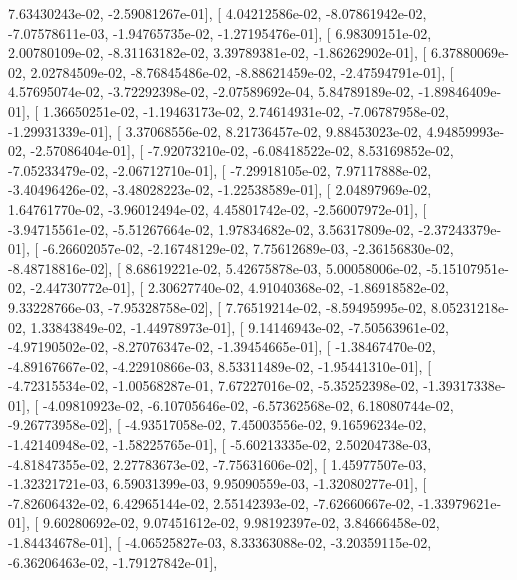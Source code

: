 \documentclass{article}
\begin{document}
          7.63430243e-02,  -2.59081267e-01],
       [  4.04212586e-02,  -8.07861942e-02,  -7.07578611e-03,
         -1.94765735e-02,  -1.27195476e-01],
       [  6.98309151e-02,   2.00780109e-02,  -8.31163182e-02,
          3.39789381e-02,  -1.86262902e-01],
       [  6.37880069e-02,   2.02784509e-02,  -8.76845486e-02,
         -8.88621459e-02,  -2.47594791e-01],
       [  4.57695074e-02,  -3.72292398e-02,  -2.07589692e-04,
          5.84789189e-02,  -1.89846409e-01],
       [  1.36650251e-02,  -1.19463173e-02,   2.74614931e-02,
         -7.06787958e-02,  -1.29931339e-01],
       [  3.37068556e-02,   8.21736457e-02,   9.88453023e-02,
          4.94859993e-02,  -2.57086404e-01],
       [ -7.92073210e-02,  -6.08418522e-02,   8.53169852e-02,
         -7.05233479e-02,  -2.06712710e-01],
       [ -7.29918105e-02,   7.97117888e-02,  -3.40496426e-02,
         -3.48028223e-02,  -1.22538589e-01],
       [  2.04897969e-02,   1.64761770e-02,  -3.96012494e-02,
          4.45801742e-02,  -2.56007972e-01],
       [ -3.94715561e-02,  -5.51267664e-02,   1.97834682e-02,
          3.56317809e-02,  -2.37243379e-01],
       [ -6.26602057e-02,  -2.16748129e-02,   7.75612689e-03,
         -2.36156830e-02,  -8.48718816e-02],
       [  8.68619221e-02,   5.42675878e-03,   5.00058006e-02,
         -5.15107951e-02,  -2.44730772e-01],
       [  2.30627740e-02,   4.91040368e-02,  -1.86918582e-02,
          9.33228766e-03,  -7.95328758e-02],
       [  7.76519214e-02,  -8.59495995e-02,   8.05231218e-02,
          1.33843849e-02,  -1.44978973e-01],
       [  9.14146943e-02,  -7.50563961e-02,  -4.97190502e-02,
         -8.27076347e-02,  -1.39454665e-01],
       [ -1.38467470e-02,  -4.89167667e-02,  -4.22910866e-03,
          8.53311489e-02,  -1.95441310e-01],
       [ -4.72315534e-02,  -1.00568287e-01,   7.67227016e-02,
         -5.35252398e-02,  -1.39317338e-01],
       [ -4.09810923e-02,  -6.10705646e-02,  -6.57362568e-02,
          6.18080744e-02,  -9.26773958e-02],
       [ -4.93517058e-02,   7.45003556e-02,   9.16596234e-02,
         -1.42140948e-02,  -1.58225765e-01],
       [ -5.60213335e-02,   2.50204738e-03,  -4.81847355e-02,
          2.27783673e-02,  -7.75631606e-02],
       [  1.45977507e-03,  -1.32321721e-03,   6.59031399e-03,
          9.95090559e-03,  -1.32080277e-01],
       [ -7.82606432e-02,   6.42965144e-02,   2.55142393e-02,
         -7.62660667e-02,  -1.33979621e-01],
       [  9.60280692e-02,   9.07451612e-02,   9.98192397e-02,
          3.84666458e-02,  -1.84434678e-01],
       [ -4.06525827e-03,   8.33363088e-02,  -3.20359115e-02,
         -6.36206463e-02,  -1.79127842e-01],
\end{document}
